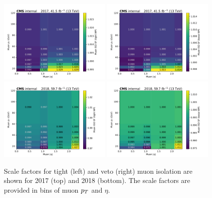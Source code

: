 \begin{figure}[ht!]
    \begin{center}
        \includegraphics[width=0.49\textwidth]{ScaleFactors/Muon/NUM_TightRelIso_DEN_TightIDandIPCut_abseta_pt_2017.pdf}
        \includegraphics[width=0.49\textwidth]{ScaleFactors/Muon/NUM_LooseRelIso_DEN_LooseID_abseta_pt_2017.pdf} \\
        \includegraphics[width=0.49\textwidth]{ScaleFactors/Muon/NUM_TightRelIso_DEN_TightIDandIPCut_abseta_pt_2018.pdf}
        \includegraphics[width=0.49\textwidth]{ScaleFactors/Muon/NUM_LooseRelIso_DEN_LooseID_abseta_pt_2018.pdf}
        \caption{
            Scale factors for tight (left) and veto (right) muon isolation are shown for 2017 (top) and
            2018 (bottom). The scale factors are provided in bins of muon $p_T$ and $\eta$.
        }
      \label{fig:sf_muon_iso}
    \end{center}
\end{figure}

